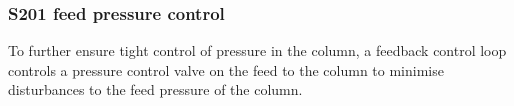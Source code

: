 

\subsubsection{S201 feed pressure control} %
To further ensure tight control of pressure in the column, a feedback control loop controls a pressure control valve on the feed to the column to minimise disturbances to the feed pressure of the column.




